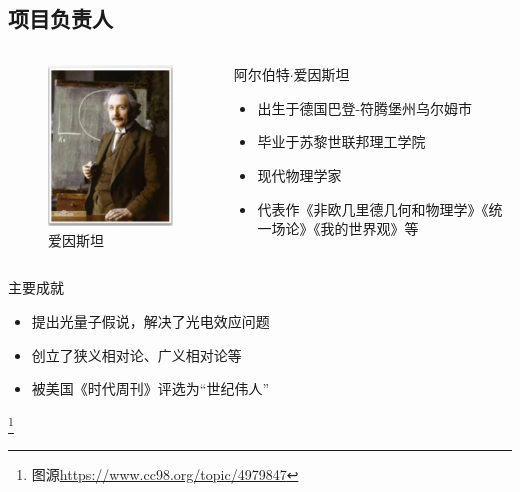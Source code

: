 \documentclass[utf8]{beamer}
\begin{document}
	\subsection{项目负责人}
	\begin{frame}
		\begin{columns}
			\begin{column}{.4\linewidth}
				\begin{figure}[h]
					\centering
					\includegraphics[width=0.5\linewidth]{p1}
					\caption{爱因斯坦}
					\label{fig:1}
				\end{figure}	
			\end{column}
			\begin{column}{.7\linewidth}	
				{\color{darkblue}阿尔伯特$\cdot$爱因斯坦}
				\begin{itemize}
					\item 出生于德国巴登-符腾堡州乌尔姆市
					\item \alert{毕业于苏黎世联邦理工学院}
					\item 现代物理学家
					\item 代表作《非欧几里德几何和物理学》《统一场论》《我的世界观》等
				\end{itemize}
			\end{column}
		\end{columns}
		\vspace{3ex}
		{\color{darkblue}主要成就}
		\begin{itemize}
			\item 提出\alert{光量子假说}，解决了\alert{光电效应问题}
			\item 创立了狭义相对论、广义相对论等
			\item 被美国《时代周刊》评选为\alert{“世纪伟人”}
		\end{itemize}
		\footnote{图源\href{https://www.cc98.org/topic/4979847}{https://www.cc98.org/topic/4979847}}
	\end{frame}
\end{document}
